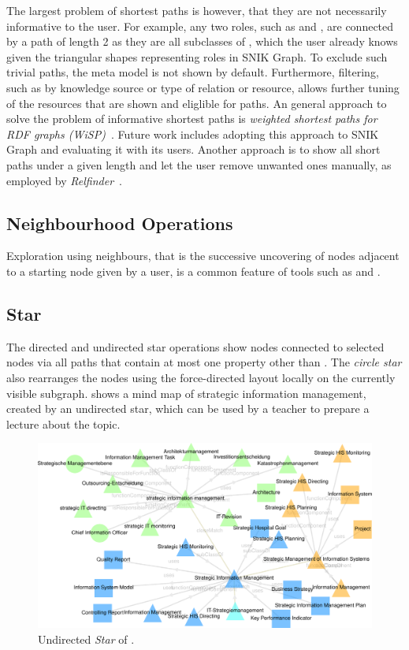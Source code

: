 \documentclass[conference]{IEEEtran}
\begin{document}
The largest problem of shortest paths is however, that they are not necessarily informative to the user. 
For example, any two roles, such as  and , are connected by a path of length 2 as they are all subclasses of , which the user already knows given the triangular shapes representing roles in SNIK Graph.
To exclude such trivial paths,  the meta model is not shown by default.
Furthermore, filtering, such as by knowledge source or type of relation or resource, allows further tuning of the resources that are shown and eliglible for paths.
An general approach to solve the problem of informative shortest paths is \emph{weighted shortest paths for RDF graphs (WiSP)}~\cite{wisp}.
Future work includes adopting this approach to SNIK Graph and evaluating it with its users.
Another approach is to show all short paths under a given length and let the user remove unwanted ones manually, as employed by \emph{Relfinder}~\cite{relfinder}.

\subsection{Neighbourhood Operations}
Exploration using neighbours, that is the successive uncovering of nodes adjacent to a starting node given by a user, is a common feature of tools such as \cite{lodlive} and \cite{vizlod}.%
\subsection{Star}
The directed and undirected star operations show nodes connected to selected nodes via all paths that contain at most one property other than .
The \emph{circle star} also rearranges the nodes using the force-directed layout locally on the currently visible subgraph.
 shows a mind map of strategic information management, created by an undirected star, which can be used by a teacher to prepare a lecture about the topic.
\begin{figure}[h!]
    \centering
    \includegraphics[width=0.9\linewidth]{strategic-im.pdf}
    \caption{Undirected \emph{Star} of .}
	\label{fig:star}
\end{figure}
\vspace{-3pt}
\end{document}
